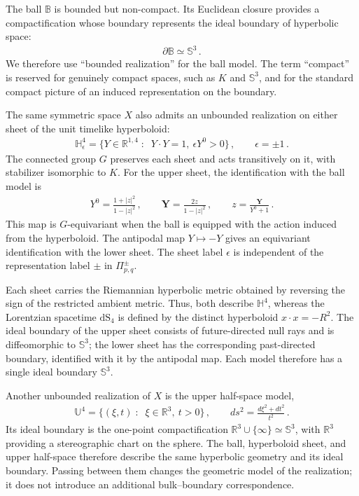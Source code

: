 \documentclass{SciPost}
\begin{document}
The ball $\mathbb B$ is bounded but non-compact. Its Euclidean closure provides a compactification whose boundary represents the ideal boundary of hyperbolic space:
\begin{align}\label{eq:compact-ball-boundary}
    \partial\mathbb B\simeq\mathbb S^3 \,.
\end{align}
We therefore use ``bounded realization'' for the ball model. The term ``compact'' is reserved for genuinely compact spaces, such as $K$ and $\mathbb S^3$, and for the standard compact picture of an induced representation on the boundary.

The same symmetric space $X$ also admits an unbounded realization on either sheet of the unit timelike hyperboloid:
\begin{align}\label{eq:hyperbolic-sheets}
    \mathbb H^4_\epsilon
    =
    \{Y\in\mathbb R^{1,4} \;\colon\;\; Y\cdot Y=1,\ \epsilon Y^0>0\}
    \,, \qquad
    \epsilon=\pm1 \,.
\end{align}
The connected group $G$ preserves each sheet and acts transitively on it, with stabilizer isomorphic to $K$. For the upper sheet, the identification with the ball model is
\begin{align}\label{eq:ball-hyperboloid-map}
    Y^0=\frac{1+|z|^2}{1-|z|^2}
    \,, \qquad
    \boldsymbol Y=\frac{2z}{1-|z|^2}
    \,, \qquad
    z=\frac{\boldsymbol Y}{Y^0+1} \,.
\end{align}
This map is $G$-equivariant when the ball is equipped with the action induced from the hyperboloid. The antipodal map $Y\mapsto-Y$ gives an equivariant identification with the lower sheet. The sheet label $\epsilon$ is independent of the representation label $\pm$ in $\Pi^\pm_{p,q}$.

Each sheet carries the Riemannian hyperbolic metric obtained by reversing the sign of the restricted ambient metric. Thus, both describe $\mathbb H^4$, whereas the Lorentzian spacetime $\mathrm{dS}_{4}$ is defined by the distinct hyperboloid $x\cdot x=-R^2$. The ideal boundary of the upper sheet consists of future-directed null rays and is diffeomorphic to $\mathbb S^3$; the lower sheet has the corresponding past-directed boundary, identified with it by the antipodal map. Each model therefore has a single ideal boundary $\mathbb S^3$.

Another unbounded realization of $X$ is the upper half-space model,
\begin{align}
    \mathbb U^4
    =\{(\xi,t) \;\colon\;\; \xi\in\mathbb R^3,\ t>0\}
    \,, \qquad
    ds^2=\frac{d\xi^2+dt^2}{t^2} \,.
\end{align}
Its ideal boundary is the one-point compactification $\mathbb R^3\cup\{\infty\}\simeq\mathbb S^3$, with $\mathbb R^3$ providing a stereographic chart on the sphere. The ball, hyperboloid sheet, and upper half-space therefore describe the same hyperbolic geometry and its ideal boundary. Passing between them changes the geometric model of the realization; it does not introduce an additional bulk--boundary correspondence.
\end{document}
